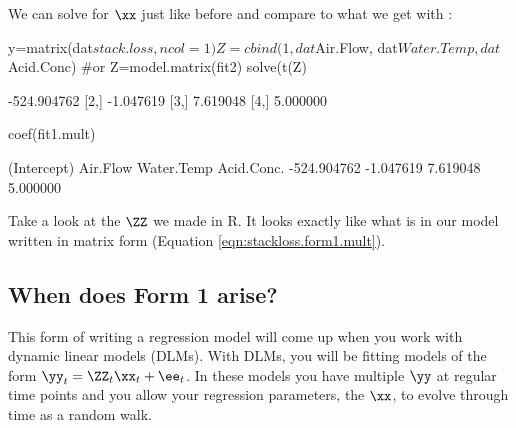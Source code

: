 We can solve for $\xx$ just like before and compare to what we get with \verb@lm@:
\begin{Schunk}
\begin{Sinput}
 y=matrix(dat$stack.loss, ncol=1)
 Z=cbind(1,dat$Air.Flow, dat$Water.Temp, dat$Acid.Conc)
 #or Z=model.matrix(fit2)
 solve(t(Z)%*%Z)%*%t(Z)%*%y
\end{Sinput}
\begin{Soutput}
            [,1]
[1,] -524.904762
[2,]   -1.047619
[3,]    7.619048
[4,]    5.000000
\end{Soutput}
\begin{Sinput}
 coef(fit1.mult)
\end{Sinput}
\begin{Soutput}
(Intercept)    Air.Flow  Water.Temp  Acid.Conc. 
-524.904762   -1.047619    7.619048    5.000000 
\end{Soutput}
\end{Schunk}
Take a look at the $\ZZ$ we made in R.  It looks exactly like what is in our model written in matrix form (Equation \ref{eqn:stackloss.form1.mult}).

\subsection{When does Form 1 arise?}

This form of writing a regression model will come up when you work with dynamic linear models (DLMs).  With DLMs, you will be fitting models of the form $\yy_t=\ZZ_t\xx_t+\ee_t$.  In these models you have multiple $\yy$ at regular time points and you allow your regression parameters, the $\xx$, to evolve through time as a random walk.

